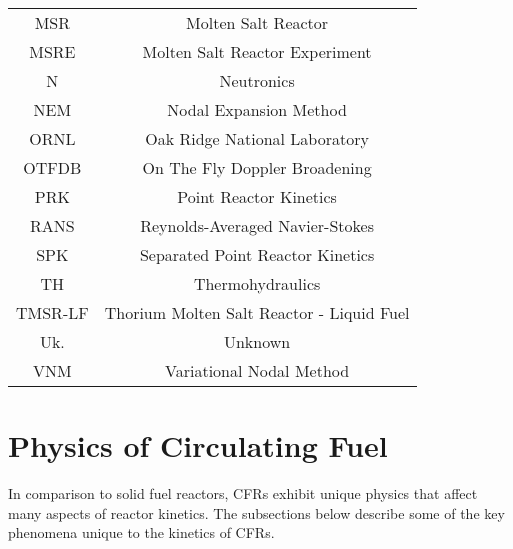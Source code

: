 \documentclass[review]{elsarticle}
\begin{document}
\begin{table}[h]
\begin{center}
\begin{tabular}{|c c|}
            MSR & Molten Salt Reactor \\
            MSRE & Molten Salt Reactor Experiment \\
            N & Neutronics \\
            NEM & Nodal Expansion Method \\
            ORNL & Oak Ridge National Laboratory \\
            OTFDB & On The Fly Doppler Broadening \\
            PRK & Point Reactor Kinetics \\
            RANS & Reynolds-Averaged Navier-Stokes \\
            SPK & Separated Point Reactor Kinetics \\
            TH & Thermohydraulics \\
            TMSR-LF & Thorium Molten Salt Reactor - Liquid Fuel \\
            Uk. & Unknown \\
            VNM & Variational Nodal Method \\
            \hline
        \end{tabular}
    \end{center}
\end{table}

\section{Physics of Circulating Fuel} \label{sec:physics}
In comparison to solid fuel reactors, CFRs exhibit unique
physics that affect many aspects of reactor kinetics. The subsections below 
describe some of the key phenomena unique to the kinetics of CFRs.
\end{document}
